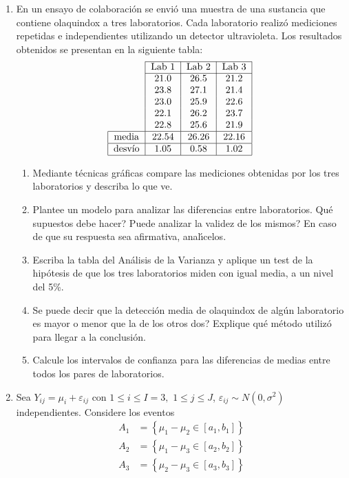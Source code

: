 \documentclass[11pt,a4paper,twoside]{article}%
\begin{document}
\begin{enumerate}
\item En un ensayo de colaboraci\'{o}n se envi\'{o} una muestra de una
sustancia que contiene olaquindox a tres laboratorios. Cada laboratorio
realiz\'{o} mediciones repetidas e independientes utilizando un detector
ultravioleta. Los resultados obtenidos se presentan en la siguiente tabla:%
\[
\text{%
\begin{tabular}
[c]{c|c|c|c|}\cline{2-4}
& Lab 1 & Lab 2 & Lab 3\\\cline{2-4}
& 21.0 & 26.5 & 21.2\\
& 23.8 & 27.1 & 21.4\\
& 23.0 & 25.9 & 22.6\\
& 22.1 & 26.2 & 23.7\\
& 22.8 & 25.6 & 21.9\\\hline
\multicolumn{1}{|c|}{media} & 22.54 & 26.26 & 22.16\\\hline
\multicolumn{1}{|c|}{desv\'{\i}o} & 1.05 & 0.58 & 1.02\\\hline
\end{tabular}
}%
\]


\begin{enumerate}
\item Mediante t\'{e}cnicas gr\'{a}ficas compare las mediciones obtenidas por
los tres laboratorios y describa lo que ve.

\item Plantee un modelo para analizar las diferencias entre laboratorios.
\textquestiondown Qu\'{e} supuestos debe hacer? \textquestiondown Puede
analizar la validez de los mismos? En caso de que su respuesta sea afirmativa, anal\'{\i}celos.

\item Escriba la tabla del An\'{a}lisis de la Varianza y aplique un test de la
hip\'{o}tesis de que los tres laboratorios miden con igual media, a un nivel
del 5\%.

\item \textquestiondown Se puede decir que la detecci\'on media de olaquindox de alg\'un laboratorio
es mayor o menor que la de los otros dos? Explique qu\'e m\'etodo utiliz\'o para llegar a la conclusi\'on.

\item Calcule los intervalos de confianza para las diferencias de medias entre
todos los pares de laboratorios.
\end{enumerate}

\item Sea $Y_{ij}=\mu_{i}+\varepsilon_{ij}$ con $1\leq i\leq I=3,$ $1\leq
j\leq J$, $\varepsilon_{ij}\sim N(0,\sigma^{2})$ independientes. Considere los
eventos
\begin{align*}
A_{1}  &  =\left\{  \mu_{1}-\mu_{2}\in\left[  a_{1},b_{1}\right]  \right\} \\
A_{2}  &  =\left\{  \mu_{1}-\mu_{3}\in\left[  a_{2},b_{2}\right]  \right\} \\
A_{3}  &  =\left\{  \mu_{2}-\mu_{3}\in\left[  a_{3},b_{3}\right]  \right\}
\end{align*}



\end{enumerate}
\end{document}
